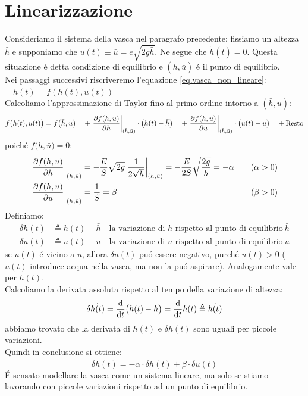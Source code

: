 \documentclass[../main.tex]{subfiles}
\begin{document}
	\section{Linearizzazione}
		Consideriamo il sistema della vasca nel paragrafo precedente: fissiamo un altezza $ \bar{h} $ e supponiamo che $ u(t) \equiv \bar{u} = e \sqrt{\overset{  }{2g \bar{h}}} $. Ne segue che $ \dot{h}(\bar{t}) = 0 $. Questa situazione \'e detta condizione di equilibrio e $( \bar{h} , \bar{u}) $ \'e il punto di equilibrio.\\
		\newline
		Nei passaggi successivi riscriveremo l'equazione \ref{eq.vasca_non_lineare}: $ \quad \dot{h(t)} = f(h(t),u(t)) $\\		
		\newline
		Calcoliamo l'approssimazione di Taylor fino al primo ordine intorno a \( (\bar{h},\bar{u}) \):
		\[
			f \big( h(t),u(t) \big) = 
			f \big(\bar{h},\bar{u} \big) \quad
			+ \left. \frac{\partial f(h,u)}{\partial h} \right|_{(\bar{h},\bar{u})} \cdot \big( h(t) - \bar{h} \big) \quad
			+ \left. \frac{\partial f(h,u)}{\partial u} \right|_{(\bar{h},\bar{u})} \cdot \big( u(t) - \bar{u} \big) \quad
			+ \text{Resto}
		\]
		poich\'e $ f \big( \bar{h},\bar{u} \big) = 0 $:
		\[
			\begin{aligned}
				\left. \frac{\partial f(h,u)}{\partial h} \right|_{(\bar{h},\bar{u})} &= - \frac{E}{S} \sqrt{2g} \left. \frac{1}{2\sqrt{h}} \right|_{(\bar{h},\bar{u})} = - \frac{E}{2S} \sqrt{\frac{2g}{\bar{h}}} = - \alpha \quad &(\alpha > 0)
				\\
				\left. \frac{\partial f(h,u)}{\partial u} \right|_{(\bar{h},\bar{u})} &= \frac{1}{S} = \beta \quad &(\beta > 0)
			\end{aligned}
		\]
		Definiamo:
		\[
			\begin{aligned}
				\delta h(t) &\triangleq h(t)- \bar{h} \quad \text{la variazione di $h$ rispetto al punto di equilibrio}\ \bar h
				\\
				\delta u(t) &\triangleq u(t)- \bar{u} \quad \text{la variazione di $u$ rispetto al punto di equilibrio}\ \bar u
			\end{aligned}
		\]
		se $ u(t) $ \'e vicino a $ \bar{u} $, allora $ \delta u(t) $ pu\'o essere negativo, purch\'e $ u(t)>0 $ ($ u(t) $ introduce acqua nella vasca, ma non la pu\'o aspirare). Analogamente vale per $ h(t) $.\\		
		\newline
		Calcoliamo la derivata assoluta rispetto al tempo della variazione di altezza:
		\[
			\delta \dot{h(t)} = \frac{\mathrm{d} }{\mathrm{d} t} \big( h(t)-\bar{h} \big) = \frac{\mathrm{d} }{\mathrm{d} t} h(t) \triangleq \dot{h(t)}
		\] 
		abbiamo trovato che la derivata di $h(t)$ e $\delta h(t)$ sono uguali per piccole variazioni.\\
		\newline
		Quindi in conclusione si ottiene:
		\[
			\delta \dot{h(t)} = -\alpha \cdot \delta h(t) + \beta \cdot \delta u(t)
		\]
		\'E sensato modellare la vasca come un sistema lineare, ma solo se stiamo lavorando con piccole variazioni rispetto ad un punto di equilibrio.
\end{document}
